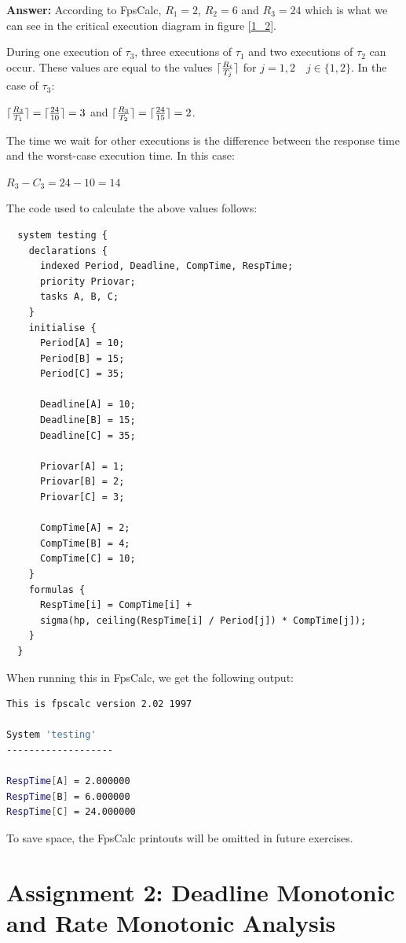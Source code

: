 \documentclass[a4paper,10pt]{article}
\DeclarePairedDelimiter{\ceil}{\lceil}{\rceil}
\newcommand{\answer}{\textbf{Answer: }}
\begin{document}
\begin{enumerate}
	\answer According to FpsCalc, $R_1 = 2$, $R_2 = 6$ and $R_3 = 24$ which is what we can see in the critical execution diagram in figure \ref{1_2}.
	
	During one execution of $\tau_3$, three executions of $\tau_1$ and two executions of $\tau_2$ can occur. These values are equal to the values $\ceil{\frac{R_i}{T_j}}$ for $j = 1, 2 \quad j \in \{1,2\}$. In the case of $\tau_3$:
	
	$\ceil{\frac{R_3}{T_1}} = \ceil{\frac{24}{10}} = 3$ and $\ceil{\frac{R_3}{T_2}} = \ceil{\frac{24}{15}} = 2$.
	
	The time we wait for other executions is the difference between the response time and the worst-case execution time. In this case:
	
	$R_3 - C_3 = 24 - 10 = 14$
	
	The code used to calculate the above values follows:
	
\begin{lstlisting}
  system testing {
    declarations {		
      indexed Period, Deadline, CompTime, RespTime;
      priority Priovar;	
      tasks A, B, C;
    }
    initialise {
      Period[A] = 10;
      Period[B] = 15;
      Period[C] = 35;
      
      Deadline[A] = 10;
      Deadline[B] = 15;
      Deadline[C] = 35;
      
      Priovar[A] = 1;
      Priovar[B] = 2;
      Priovar[C] = 3;
      
      CompTime[A] = 2;
      CompTime[B] = 4;
      CompTime[C] = 10;
    }
    formulas {
      RespTime[i] = CompTime[i] +
      sigma(hp, ceiling(RespTime[i] / Period[j]) * CompTime[j]);
    }
  }				   
\end{lstlisting}

When running this in FpsCalc, we get the following output:

\begin{lstlisting}[language=bash]
This is fpscalc version 2.02 1997

System 'testing'
-------------------

RespTime[A] = 2.000000
RespTime[B] = 6.000000
RespTime[C] = 24.000000
\end{lstlisting}

To save space, the FpsCalc printouts will be omitted in future exercises.

\end{enumerate}

\section{Assignment 2: Deadline Monotonic and Rate Monotonic Analysis}
\end{document}
